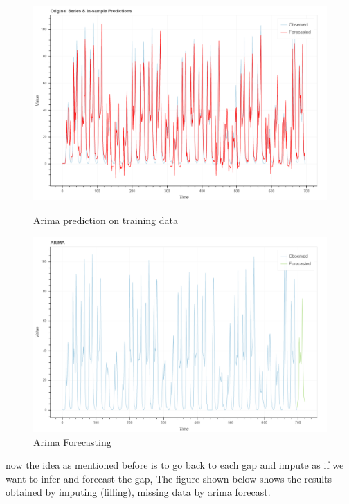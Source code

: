 \begin{figure}[H]
\centering
\begin{minipage}{.49\linewidth}
    \includegraphics[width=.9\textwidth]{img/arima_training.png}    
    \caption{Arima prediction on training data}
    \label{fig:trainig_arima}
\end{minipage}
\hfill
\begin{minipage}{.49\linewidth}
    \includegraphics[width=.9\textwidth]{img/arima_forcasting.png} 
    \caption{Arima Forecasting}
    \label{fig:forcasting}
\end{minipage}
\end{figure}

now the idea as mentioned before is to go back to each gap and impute as if we want to infer and forecast the gap, The figure shown below shows the results obtained by imputing (filling), missing data by arima forecast.


